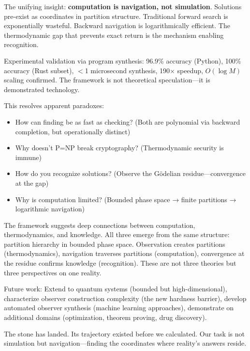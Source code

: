 \documentclass[twocolumn,10pt]{article}
\theoremstyle{definition}
\theoremstyle{remark}
\begin{document}
\vspace{0.2cm}
\noindent The unifying insight: \textbf{computation is navigation, not simulation}. Solutions pre-exist as coordinates in partition structure. Traditional forward search is exponentially wasteful. Backward navigation is logarithmically efficient. The thermodynamic gap that prevents exact return is the mechanism enabling recognition.

\vspace{0.2cm}
\noindent Experimental validation via program synthesis: 96.9\% accuracy (Python), 100\% accuracy (Rust subset), $<$1 microsecond synthesis, 190$\times$ speedup, $O(\log M)$ scaling confirmed. The framework is not theoretical speculation—it is demonstrated technology.

\vspace{0.2cm}
\noindent This resolves apparent paradoxes:
\begin{itemize}
\item How can finding be as fast as checking? (Both are polynomial via backward completion, but operationally distinct)
\item Why doesn't P=NP break cryptography? (Thermodynamic security is immune)
\item How do you recognize solutions? (Observe the Gödelian residue—convergence at the gap)
\item Why is computation limited? (Bounded phase space → finite partitions → logarithmic navigation)
\end{itemize}

\vspace{0.2cm}
\noindent The framework suggests deep connections between computation, thermodynamics, and knowledge. All three emerge from the same structure: partition hierarchy in bounded phase space. Observation creates partitions (thermodynamics), navigation traverses partitions (computation), convergence at the residue confirms knowledge (recognition). These are not three theories but three perspectives on one reality.

\vspace{0.2cm}
\noindent Future work: Extend to quantum systems (bounded but high-dimensional), characterize observer construction complexity (the new hardness barrier), develop automated observer synthesis (machine learning approaches), demonstrate on additional domains (optimization, theorem proving, drug discovery).

\vspace{0.2cm}
\noindent The stone has landed. Its trajectory existed before we calculated. Our task is not simulation but navigation—finding the coordinates where reality's answers reside.



\end{document}
